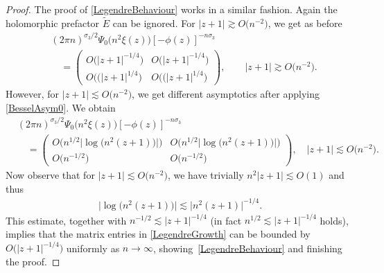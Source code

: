 \documentclass[11pt]{article}
\numberwithin{equation}{section}
\numberwithin{equation}{section}
\begin{document}
\begin{proof}
The proof of \eqref{LegendreBehaviour} works in a similar fashion. Again the holomorphic prefactor $\widetilde E$ can be ignored. For $|z+1|\gtrsim O\big(n^{-2}\big)$, we get as before
\begin{align*}
& (2\pi n)^{\sigma_3/2}\Psi_0\big(n^2 \xi(z)\big)[-\phi(z)]^{-n\sigma_3}
 \\
 &\quad=\begin{pmatrix}
 O\big(|z+1|^{-1/4}\big) & O\big(|z+1|^{-1/4}\big)
 \\
 O\big((|z+1|^{1/4}\big) & O\big((|z+1|^{1/4}\big)
 \end{pmatrix}, \qquad |z+1| \gtrsim O\big(n^{-2}\big).
\end{align*}
However, for $|z+1|\lesssim O\big(n^{-2}\big)$, we get different asymptotics after applying \eqref{BesselAsym0}. We obtain%
\begin{align} \nonumber
 &(2\pi n)^{\sigma_3/2}\Psi_0\big(n^2 \xi(z)\big) [-\phi(z)]^{-n\sigma_3}
 \\\label{LegendreGrowth}
 &\quad= \begin{pmatrix}
 O\big(n^{1/2} \big|\log\big(n^2(z+1)\big)\big|\big) & O\big(n^{1/2} \big|\log \big(n^2(z+1)\big)\big|\big)
 \\
 O\big(n^{-1/2}\big) & O\big(n^{-1/2}\big)
 \end{pmatrix}, \quad |z+1|\lesssim O\big(n^{-2}\big).
\end{align}
Now observe that for $|z+1|\lesssim O\big(n^{-2}\big)$, we have trivially $n^2|z+1|\lesssim O(1)$ and thus
\begin{align*}
 \big|\log\big(n^2(z+1)\big)\big| \lesssim \big|n^2(z+1)\big|^{-1/4}.
\end{align*}
This estimate, together with $n^{-1/2} \lesssim |z+1|^{-1/4}$ \big(in fact $n^{1/2} \lesssim |z+1|^{-1/4}$ holds\big), implies that the matrix entries in \eqref{LegendreGrowth} can be bounded by $O\big(|z+1|^{-1/4}\big)$ uniformly as $n \to \infty$, showing~\eqref{LegendreBehaviour} and finishing the proof.
\end{proof}
\end{document}
